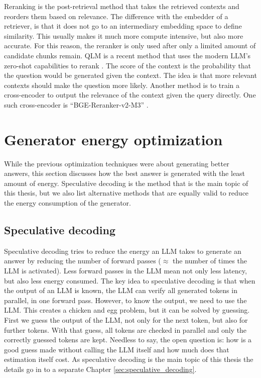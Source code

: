 Reranking is the post-retrieval method that takes the retrieved contexts and reorders them based on relevance. The difference with the embedder of a retriever, is that it does not go to an intermediary embedding space to define similarity. This usually makes it much more compute intensive, but also more accurate. For this reason, the reranker is only used after only a limited amount of candidate chunks remain. QLM is a recent method that uses the modern LLM's zero-shot capabilities to rerank \cite{zhuang2023qlm}. The score of the context is the probability that the question would be generated given the context. The idea is that more relevant contexts should make the question more likely. Another method is to train a cross-encoder to output the relevance of the context given the query directly. One such cross-encoder is ``BGE-Reranker-v2-M3'' \cite{chen2024bge}.

\section{Generator energy optimization}
While the previous optimization techniques were about generating better answers, this section discusses how the best answer is generated with the least amount of energy. Speculative decoding is the method that is the main topic of this thesis, but we also list alternative methods that are equally valid to reduce the energy consumption of the generator.

\subsection{Speculative decoding}
Speculative decoding tries to reduce the energy an LLM takes to generate an answer by reducing the number of forward passes ($\approx$ the number of times the LLM is activated). Less forward passes in the LLM mean not only less latency, but also less energy consumed. The key idea to speculative decoding is that when the output of an LLM is known, the LLM can verify all generated tokens in parallel, in one forward pass. However, to know the output, we need to use the LLM. This creates a chicken and egg problem, but it can be solved by guessing. First we guess the output of the LLM, not only for the next token, but also for further tokens. With that guess, all tokens are checked in parallel and only the correctly guessed tokens are kept. Needless to say, the open question is: how is a good guess made without calling the LLM itself and how much does that estimation itself cost. As speculative decoding is the main topic of this thesis the details go in to a separate Chapter \ref{sec:speculative_decoding}.

